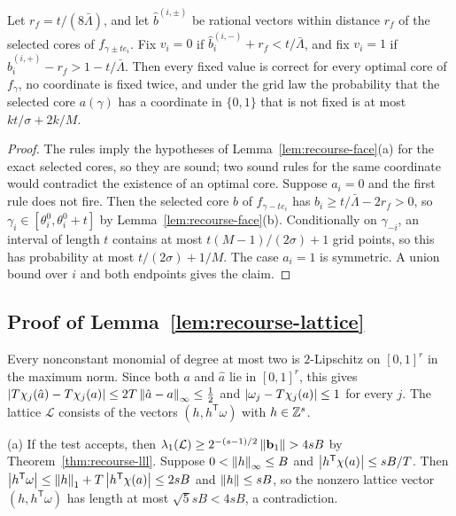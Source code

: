 \begin{corollary}
\label{cor:recourse-face-rules}
Let $r_f=t/(8\bar\Lambda)$, and let $\hat b^{(i,\pm)}$ be rational
vectors within distance $r_f$ of the selected cores of
$f_{\gamma\pm te_i}$. Fix $v_i=0$ if $\hat b^{(i,-)}_i+r_f<t/\bar\Lambda$,
and fix $v_i=1$ if $\hat b^{(i,+)}_i-r_f>1-t/\bar\Lambda$. Then every fixed
value is correct for every optimal core of $f_\gamma$, no coordinate is
fixed twice, and under the grid law the probability that the selected
core $a(\gamma)$ has a coordinate in $\{0,1\}$ that is not fixed is at
most $kt/\sigma+2k/M$.
\end{corollary}

\begin{proof}
The rules imply the hypotheses of Lemma~\ref{lem:recourse-face}(a) for
the exact selected cores, so they are sound; two sound rules for the same
coordinate would contradict the existence of an optimal core. Suppose
$a_i=0$ and the first rule does not fire. Then the selected core $b$ of
$f_{\gamma-te_i}$ has $b_i\ge t/\bar\Lambda-2r_f>0$, so
$\gamma_i\in[\theta_i^0,\theta_i^0+t]$ by Lemma~\ref{lem:recourse-face}(b).
Conditionally on $\gamma_{-i}$, an interval of length $t$ contains at
most $t(M-1)/(2\sigma)+1$ grid points, so this has probability at most
$t/(2\sigma)+1/M$. The case $a_i=1$ is symmetric. A union bound over
$i$ and both endpoints gives the claim.
\end{proof}

\subsection{Proof of Lemma~\ref{lem:recourse-lattice}}
\label{app:recourse-lattice}

Every nonconstant monomial of degree at most two is $2$-Lipschitz on
$[0,1]^r$ in the maximum norm. Since both $a$ and $\hat a$ lie in
$[0,1]^r$, this gives
$\left\lvert T\chi_j(\hat a)-T\chi_j(a)\right\rvert\le2T\left\lVert\hat a-a\right\rVert_\infty\le\frac12$ and
$\left\lvert\omega_j-T\chi_j(a)\right\rvert\le1$ for every $j$. The lattice $\mathcal L$
consists of the vectors $(h,h^{\mathsf T}\omega)$ with $h\in\mathbb Z^s$.

(a) If the test accepts, then
$\lambda_1(\mathcal L)\ge2^{-(s-1)/2}\left\lVert\mathbf b_1\right\rVert>4sB$ by
Theorem~\ref{thm:recourse-lll}. Suppose $0<\left\lVert h\right\rVert_\infty\le B$ and
$\left\lvert h^{\mathsf T}\chi(a)\right\rvert\le sB/T$. Then
$\left\lvert h^{\mathsf T}\omega\right\rvert\le\left\lVert h\right\rVert_1+T\left\lvert h^{\mathsf T}\chi(a)\right\rvert\le2sB$
and $\left\lVert h\right\rVert\le sB$, so the nonzero lattice vector $(h,h^{\mathsf T}\omega)$
has length at most $\sqrt5sB<4sB$, a contradiction.

